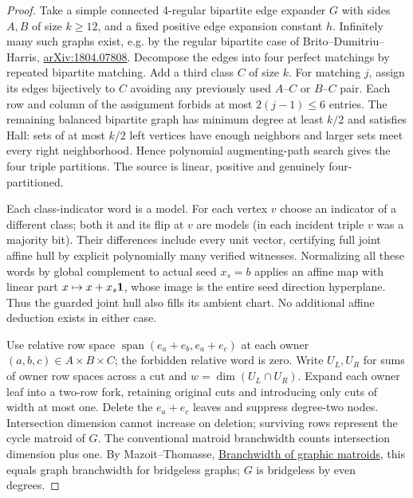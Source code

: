 \documentclass[11pt]{article}
\begin{document}
\begin{proof}
Take a simple connected 4-regular bipartite edge expander $G$ with sides $A,B$ of size $k\ge12$, and a fixed positive edge expansion constant $h$. Infinitely many such graphs exist, e.g. by the regular bipartite case of Brito--Dumitriu--Harris, \href{https://arxiv.org/abs/1804.07808}{arXiv:1804.07808}. Decompose the edges into four perfect matchings by repeated bipartite matching. Add a third class $C$ of size $k$. For matching $j$, assign its edges bijectively to $C$ avoiding any previously used $A$--$C$ or $B$--$C$ pair. Each row and column of the assignment forbids at most $2(j-1)\le6$ entries. The remaining balanced bipartite graph has minimum degree at least $k/2$ and satisfies Hall: sets of at most $k/2$ left vertices have enough neighbors and larger sets meet every right neighborhood. Hence polynomial augmenting-path search gives the four triple partitions. The source is linear, positive and genuinely four-partitioned.

Each class-indicator word is a model. For each vertex $v$ choose an indicator of a different class; both it and its flip at $v$ are models (in each incident triple $v$ was a majority bit). Their differences include every unit vector, certifying full joint affine hull by explicit polynomially many verified witnesses. Normalizing all these words by global complement to actual seed $x_s=b$ applies an affine map with linear part $x\mapsto x+x_s{\bf1}$, whose image is the entire seed direction hyperplane. Thus the guarded joint hull also fills its ambient chart. No additional affine deduction exists in either case.

Use relative row space $\operatorname{span}(e_a+e_b,e_a+e_c)$ at each owner $(a,b,c)\in A\times B\times C$; the forbidden relative word is zero. Write $U_L,U_R$ for sums of owner row spaces across a cut and $w=\dim(U_L\cap U_R)$. Expand each owner leaf into a two-row fork, retaining original cuts and introducing only cuts of width at most one. Delete the $e_a+e_c$ leaves and suppress degree-two nodes. Intersection dimension cannot increase on deletion; surviving rows represent the cycle matroid of $G$. The conventional matroid branchwidth counts intersection dimension plus one. By Mazoit--Thomasse, \href{https://www.cambridge.org/core/books/abs/surveys-in-combinatorics-2007/bandwidth-of-graphic-matroids/C9CA233149A3C3A818092BF277B25614}{Branchwidth of graphic matroids}, this equals graph branchwidth for bridgeless graphs; $G$ is bridgeless by even degrees.


\end{proof}
\end{document}
